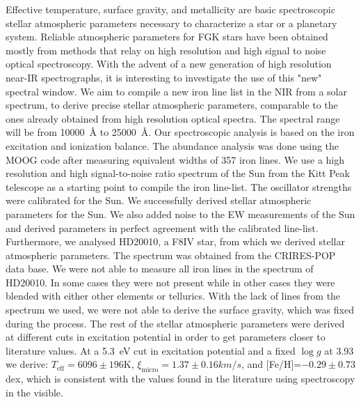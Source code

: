 \documentclass{aa}
\begin{document}
\abstract
{Effective temperature, surface gravity, and metallicity are basic
spectroscopic stellar atmospheric parameters necessary to characterize a
star or a planetary system. Reliable atmospheric parameters for FGK stars
have been obtained mostly from methods that relay on high resolution and
high signal to noise optical spectroscopy.
With the advent of a new generation of high resolution
near-IR spectrographs, it is interesting to investigate the use of this
"new" spectral window.}
{We aim to compile a new iron line list in the NIR from a solar
spectrum, to derive precise stellar atmospheric parameters, comparable
to the ones already obtained from high resolution optical spectra.
The spectral range will be from \SI{10000}{\angstrom} to \SI{25000}{\angstrom}.}
{Our spectroscopic analysis is based on the iron excitation and
ionization balance. The abundance analysis was done using the MOOG code
after measuring equivalent widths of 357 iron lines.
We use a high resolution and high signal-to-noise ratio spectrum
of the Sun from the Kitt Peak telescope as a starting point to compile
the iron line-list. The oscillator strengths were calibrated for the Sun.}
{We successfully derived stellar atmospheric parameters for the Sun.
We also added noise to the EW measurements of the Sun and derived
parameters in perfect agreement with the calibrated line-list. Furthermore,
we analysed HD20010, a F8IV star, from which we derived stellar
atmospheric parameters. The spectrum was obtained from the CRIRES-POP
data base. We were not able to measure all iron lines in the
spectrum of HD20010. In some cases they were not present while in other
cases they were blended with either other elements or tellurics.
With the lack of  lines from the
spectrum we used, we were not able to derive the surface gravity, which
was fixed during the process. The rest of the stellar atmospheric
parameters were derived at different cuts in excitation potential in
order to get parameters closer to literature values. At a \SI{5.3}{eV}
cut in excitation potential and a fixed $\log g$ at 3.93 we derive:
$T_\mathrm{eff}=6096\pm196$K, $\xi_\mathrm{micro}=1.37\pm0.16\si{km/s}$,
and [Fe/H]=$-0.29\pm0.73$ dex, which is consistent with the values
found in the literature using spectroscopy in the visible.}
{}



\maketitle
\end{document}
